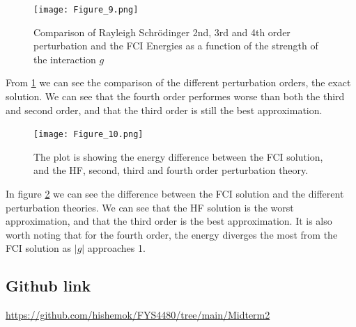 \documentclass[a4paper,12pt]{article}
\begin{document}
\begin{figure}[h!]
    \centering
    \texttt{[image: Figure\_9.png]}
    \caption{Comparison of Rayleigh Schrödinger 2nd, 3rd and 4th order perturbation and the FCI
    Energies as a function of the strength of the interaction $g$}
    \label{fig:fig9}
\end{figure}
From \ref{fig:fig9} we can see the comparison of the different perturbation orders, the exact solution. We can see that the fourth order performes worse than both the third and second order, and that the third order is still the best approximation.

\begin{figure}[h!]
    \centering
    \texttt{[image: Figure\_10.png]}
    \caption{The plot is showing the energy difference between the FCI solution, and the HF, second, third and fourth order perturbation theory. }
    \label{fig:fig10}
\end{figure}
In figure \ref{fig:fig10} we can see the difference between the FCI solution and the different perturbation theories. We can see that the HF solution is the worst approximation, and that the third order is the best approximation. It is also worth noting that for the fourth order, the energy diverges the most from the FCI solution as $|g|$ approaches 1.\\


\subsection*{Github link}
\url{https://github.com/hishemok/FYS4480/tree/main/Midterm2}
\end{document}
